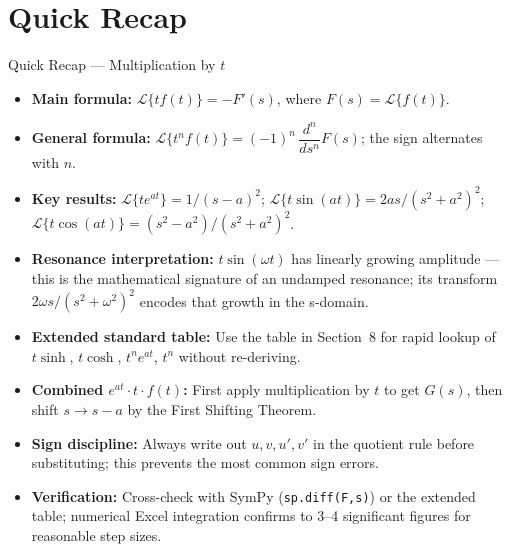 \documentclass[12pt,a4paper]{article}
\begin{document}
\section{Quick Recap}
\begin{learnbox}{Quick Recap --- Multiplication by $t$}
\begin{itemize}
  \item \textbf{Main formula:}
        $\mathcal{L}\{tf(t)\} = -F'(s)$, where $F(s)=\mathcal{L}\{f(t)\}$.
  \item \textbf{General formula:}
        $\mathcal{L}\{t^n f(t)\} = (-1)^n\,\dfrac{d^n}{ds^n}F(s)$;
        the sign alternates with $n$.
  \item \textbf{Key results:}
        $\mathcal{L}\{te^{at}\} = 1/(s-a)^2$;\quad
        $\mathcal{L}\{t\sin(at)\} = 2as/(s^2+a^2)^2$;\quad
        $\mathcal{L}\{t\cos(at)\} = (s^2-a^2)/(s^2+a^2)^2$.
  \item \textbf{Resonance interpretation:}
        $t\sin(\omega t)$ has linearly growing amplitude --- this is the
        mathematical signature of an undamped resonance; its transform
        $2\omega s/(s^2+\omega^2)^2$ encodes that growth in the s-domain.
  \item \textbf{Extended standard table:}
        Use the table in Section~8 for rapid lookup of $t\sinh$, $t\cosh$,
        $t^n e^{at}$, $t^n$ without re-deriving.
  \item \textbf{Combined $e^{at}\cdot t\cdot f(t)$:}
        First apply multiplication by $t$ to get $G(s)$, then shift
        $s\to s-a$ by the First Shifting Theorem.
  \item \textbf{Sign discipline:}
        Always write out $u, v, u', v'$ in the quotient rule before
        substituting; this prevents the most common sign errors.
  \item \textbf{Verification:}
        Cross-check with SymPy (\texttt{sp.diff(F,s)}) or the extended
        table; numerical Excel integration confirms to 3--4 significant
        figures for reasonable step sizes.
\end{itemize}
\end{learnbox}
\end{document}

